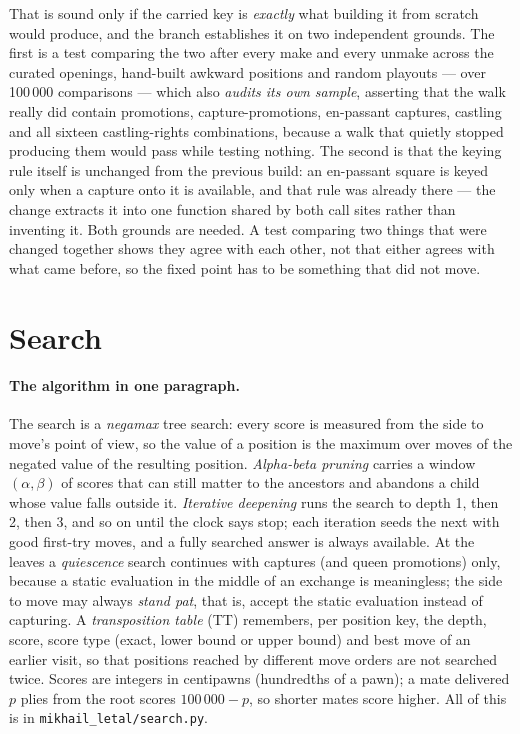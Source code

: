 \documentclass[11pt,a4paper]{article}
\newcommand{\code}[1]{\texttt{#1}}
\begin{document}
That is sound only if the carried key is \emph{exactly} what building it from scratch would produce,
and the branch establishes it on two independent grounds. The first is a test comparing the two after
every make and every unmake across the curated openings, hand-built awkward positions and random
playouts --- over 100\,000 comparisons --- which also \emph{audits its own sample}, asserting that the
walk really did contain promotions, capture-promotions, en-passant captures, castling and all sixteen
castling-rights combinations, because a walk that quietly stopped producing them would pass while
testing nothing. The second is that the keying rule itself is unchanged from the previous build: an
en-passant square is keyed only when a capture onto it is available, and that rule was already there
--- the change extracts it into one function shared by both call sites rather than inventing it. Both
grounds are needed. A test comparing two things that were changed together shows they agree with each
other, not that either agrees with what came before, so the fixed point has to be something that did
not move.

\section{Search}\label{sec:search}
\paragraph{The algorithm in one paragraph.} The search is a \emph{negamax} tree search: every score is
measured from the side to move's point of view, so the value of a position is the maximum over moves of
the negated value of the resulting position. \emph{Alpha-beta pruning} carries a window $(\alpha, \beta)$
of scores that can still matter to the ancestors and abandons a child whose value falls outside it.
\emph{Iterative deepening} runs the search to depth 1, then 2, then 3, and so on until the clock says
stop; each iteration seeds the next with good first-try moves, and a fully searched answer is always
available. At the leaves a \emph{quiescence} search continues with captures (and queen promotions) only,
because a static evaluation in the middle of an exchange is meaningless; the side to move may always
\emph{stand pat}, that is, accept the static evaluation instead of capturing. A \emph{transposition table}
(TT) remembers, per position key, the depth, score, score type (exact, lower bound or upper bound) and
best move of an earlier visit, so that positions reached by different move orders are not searched
twice. Scores are integers in centipawns (hundredths of a pawn); a mate delivered $p$ plies from the root
scores $100\,000 - p$, so shorter mates score higher. All of this is in \code{mikhail\_letal/search.py}.
\end{document}
